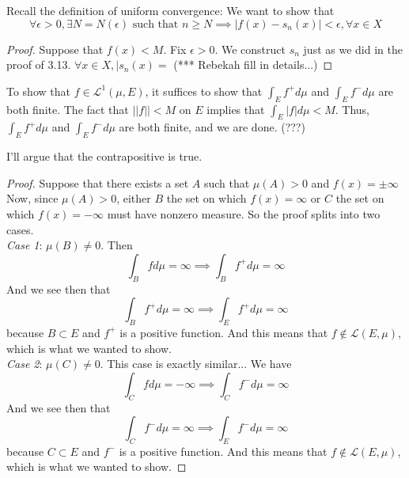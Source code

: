 \documentclass[12pt]{article}
\newenvironment{problem}[2][Problem]{\begin{trivlist}
\item[\hskip \labelsep {\bfseries #1}\hskip \labelsep {\bfseries #2.}]}{\end{trivlist}}
\theoremstyle{definition}
\theoremstyle{definition}
\theoremstyle{definition}
\theoremstyle{definition}
\begin{document}
\begin{problem}{3.14}
Recall the definition of uniform convergence: We want to show that 
$$ \forall \epsilon > 0, \exists N=N(\epsilon) \text{ such that } n \geq N \implies |f(x)-s_n(x)| < \epsilon, \forall x \in X$$
\begin{proof}
Suppose that $f(x) < M$. Fix $\epsilon > 0$. We construct $s_n$ just as we did in the proof of 3.13. $\forall x \in X, |s_n(x) = $ (*** Rebekah fill in details...)
\end{proof}
\end{problem}
\begin{problem}{4.13}
To show that $f \in \mathcal{L}^1(\mu, E)$, it suffices to show that $\int_Ef^+d\mu$ and $\int_Ef^-d\mu$ are both finite. The fact that $||f|| < M$ on $E$ implies that $\int_E|f|d\mu < M$. Thus, $\int_Ef^+d\mu$ and $\int_Ef^-d\mu$ are both finite, and we are done. (???)
\end{problem}
\begin{problem}{4.14}
I'll argue that the contrapositive is true.
\begin{proof}
Suppose that there exists a set $A$ such that $\mu(A)>0$ and $f(x) = \pm \infty$ Now, since $\mu(A) > 0$, either $B$ the set on which $f(x)=\infty$ or $C$ the set on which $f(x) =-\infty$ must have nonzero measure. So the proof splits into two cases. \\
\textit{Case 1}: $\mu(B) \neq 0$. Then 
$$\int_B fd\mu = \infty \implies \int_Bf^+d\mu = \infty $$ 
And we see then that 
$$\int_B f^+d\mu = \infty \implies \int_E f^+d\mu = \infty $$ 
because $B \subset E$ and $f^+$ is a positive function. And this means that $f \notin \mathcal{L}(E, \mu)$, which is what we wanted to show.\\
\textit{Case 2}: $\mu(C) \neq 0$. This case is exactly similar... We have
$$\int_C fd\mu = -\infty \implies \int_Cf^-d\mu = \infty $$ 
And we see then that 
$$\int_C f^-d\mu = \infty \implies \int_E f^-d\mu = \infty $$ 
because $C \subset E$ and $f^-$ is a positive function. And this means that $f \notin \mathcal{L}(E, \mu)$, which is what we wanted to show.
\end{proof}
\end{problem}
\end{document}
